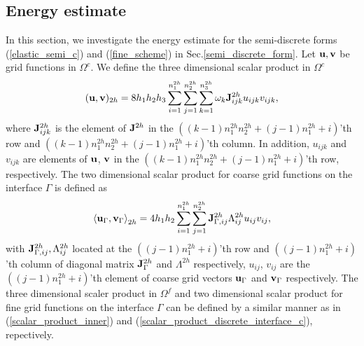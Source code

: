 \subsection{Energy estimate}
In this section, we investigate the energy estimate for the semi-discrete forms (\ref{elastic_semi_c}) and (\ref{fine_scheme}) in Sec.\ref{semi_discrete_form}. %
Let ${\bf u}, {\bf v}$ be grid functions in $\Omega^c$. We define the three dimensional scalar product in $\Omega^c$
\begin{equation}\label{scalar_product_inner}
({\bf u}, {\bf v})_{2h} = 8h_1h_2h_3\sum_{i=1}^{n_1^{2h}}\sum_{j=1}^{n_2^{2h}}\sum_{k=1}^{n_3^{2h}}\omega_k{\bf J}_{ijk}^{2h}u_{ijk}v_{ijk},
\end{equation}
where ${\bf J}^{2h}_{ijk}$ is the element of ${\bf J}^{2h}$ in the $((k-1)n_1^{2h}n_2^{2h}+(j-1)n_1^{2h}+i)$'th row and $((k-1)n_1^{2h}n_2^{2h}+(j-1)n_1^{2h}+i)$'th column. In addition, $u_{ijk}$ and $v_{ijk}$ are elements of  ${\bf u}$, ${\bf v}$ in the $((k-1)n_1^{2h}n_2^{2h}+(j-1)n_1^{2h}+i)$'th row, respectively. The two dimensional scalar product for coarse grid functions on the interface $\Gamma$ is defined as 
\begin{equation}\label{scalar_product_discrete_interface_c}
\left<{\bf u}_{\Gamma}, {\bf v}_{\Gamma}\right>_{2h} = 4h_1h_2\sum_{i=1}^{n_1^{2h}}\sum_{j=1}^{n_2^{2h}}{\bf  J}_{\Gamma,ij}^{2h}\Lambda^{2h}_{ij}u_{ij}v_{ij},
\end{equation}
with ${\bf J}^{2h}_{\Gamma,ij}, \Lambda^{2h}_{ij}$ located at the $((j-1)n_1^{2h}+i)$'th row and $((j-1)n_1^{2h}+i)$'th column of diagonal matrix ${\bf J}_{\Gamma}^{2h}$ and $\Lambda^{2h}$ respectively, $u_{ij}$, $v_{ij}$ are the $((j-1)n_1^{2h}+i)$'th element of coarse grid vectors ${\bf u}_{\Gamma}$ and ${\bf v}_{\Gamma}$ respectively. The three dimensional scaler product in $\Omega^f$ and two dimensional scalar product for fine grid functions on the interface $\Gamma$ can be defined by a similar manner as in (\ref{scalar_product_inner}) and (\ref{scalar_product_discrete_interface_c}), repectively.%
